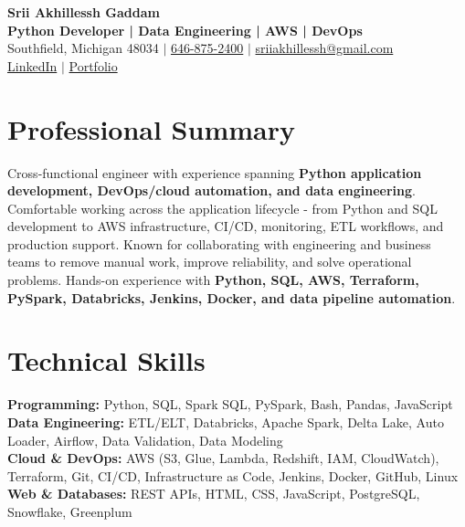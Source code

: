 \documentclass[letterpaper,10pt]{article}
\begin{document}
\fontsize{9.35pt}{10.45pt}\selectfont

\begin{center}
    {\LARGE \textbf{Srii Akhillessh Gaddam}} \\[-1pt]
    \textbf{Python Developer | Data Engineering | AWS | DevOps} \\[2pt]
    Southfield, Michigan 48034 $|$
    \href{tel:6468752400}{646-875-2400} $|$
    \href{mailto:sriiakhillessh@gmail.com}{sriiakhillessh@gmail.com} \\[1pt]
    \href{https://www.linkedin.com/in/srii-akhiilessh-gaddam-b48668191/}{LinkedIn} $|$
    \href{https://sriiakhillesshg.github.io/portfolio/}{Portfolio}
\end{center}
\vspace{-8pt}

\section{Professional Summary}
\small{Cross-functional engineer with experience spanning \textbf{Python application development, DevOps/cloud automation, and data engineering}. Comfortable working across the application lifecycle - from Python and SQL development to AWS infrastructure, CI/CD, monitoring, ETL workflows, and production support. Known for collaborating with engineering and business teams to remove manual work, improve reliability, and solve operational problems. Hands-on experience with \textbf{Python, SQL, AWS, Terraform, PySpark, Databricks, Jenkins, Docker, and data pipeline automation}.}

\section{Technical Skills}
\small{
\textbf{Programming:} Python, SQL, Spark SQL, PySpark, Bash, Pandas, JavaScript \\
\textbf{Data Engineering:} ETL/ELT, Databricks, Apache Spark, Delta Lake, Auto Loader, Airflow, Data Validation, Data Modeling \\
\textbf{Cloud \& DevOps:} AWS (S3, Glue, Lambda, Redshift, IAM, CloudWatch), Terraform, Git, CI/CD, Infrastructure as Code, Jenkins, Docker, GitHub, Linux \\
\textbf{Web \& Databases:} REST APIs, HTML, CSS, JavaScript, PostgreSQL, Snowflake, Greenplum
}
\end{document}
